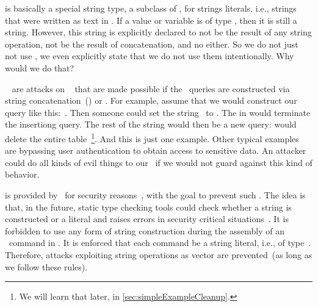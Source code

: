  is basically a special string type, a subclass of , for strings literals, i.e., strings that were written as text in \python.
If a value or variable is of type , then it is still a string.
However, this string is explicitly declared to not be the result of any string operation, not be the result of concatenation, and no  either.
So we do not just not use , we even explicitly state that we do not use them intentionally.
Why would we do that?%
%
\begin{sloppypar}%
~\cite{ASO2024SIADPP,KDP2024AOSIAITCAIWA,CMCVGHRDCAAFL2023SIADINFD,S2008SI,databases} are attacks on \sql\  that are made possible if the \sql\ queries are constructed via string concatenation~(\pythonil{+}) or .
For example, assume that we would construct our query like this:~.
Then someone could set the string~ to .
The \textil{);} in  would terminate the insertiong query.
The rest of the string would then be a new query:  would delete the entire table~\footnote{We will learn that later, in \cref{sec:simpleExampleCleanup}.}.
And this is just one example.
Other typical examples are bypassing user authentication to obtain access to sensitive data.
An attacker could do all kinds of evil things to our \db\ if we would not guard against this kind of behavior.
\end{sloppypar}%
%
 is provided by \python\ for security reasons~\cite{PEP675}, with the goal to prevent such .
The idea is that, in the future, static type checking tools could check whether a string is constructed or a literal and raises errors in security critical situations~\cite{PEP675,VDGE2022PPDAFP:ST}.
It is forbidden to use any form of string construction during the assembly of an \sql\ command in \psycopg.
It is enforced that each command be a string literal, i.e., of type~.
Therefore, attacks exploiting string operations as vector are prevented~(as long as we follow these rules).

